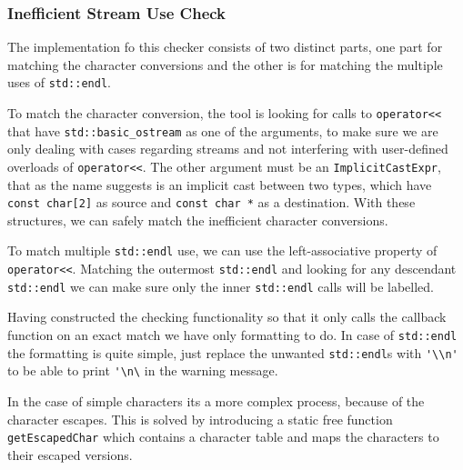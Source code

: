 \subsubsection{Inefficient Stream Use Check}
\par The implementation fo this checker consists of two distinct parts, one part for matching the character conversions and the other is for matching the multiple uses of \verb|std::endl|. \medskip
\par To match the character conversion, the tool is looking for calls to \verb|operator<<| that have \verb|std::basic_ostream| as one of the arguments, to make sure we are only dealing with cases regarding streams and not interfering with user-defined overloads of \verb|operator<<|. The other argument must be an \verb|ImplicitCastExpr|, that as the name suggests is an implicit cast between two types, which have \verb|const char[2]| as source and \verb|const char *| as a destination. With these structures, we can safely match the inefficient character conversions. \medskip
\par To match multiple \verb|std::endl| use, we can use the left-associative property of \verb|operator<<|. Matching the outermost \verb|std::endl| and looking for any descendant \verb|std::endl| we can make sure only the inner \verb|std::endl| calls will be labelled. \medskip
\par Having constructed the checking functionality so that it only calls the callback function on an exact match we have only formatting to do. In case of \verb|std::endl| the formatting is quite simple, just replace the unwanted \verb|std::endl|s with \verb|'\\n'| to be able to print \verb|'\n\| in the warning message. \medskip
\par In the case of simple characters its a more complex process, because of the character escapes. This is solved by introducing a static free function \verb|getEscapedChar| which contains a character table and maps the characters to their escaped versions.
